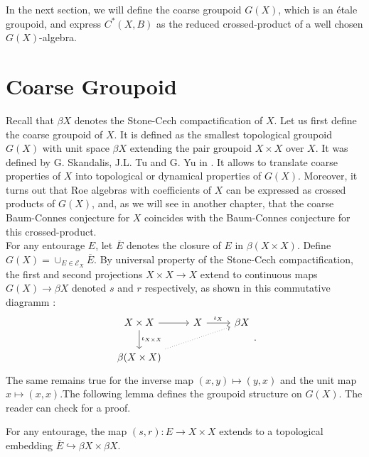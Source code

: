 In the next section, we will define the coarse groupoid $G(X)$, which is an étale groupoid, and express $C^*(X,B)$ as the reduced crossed-product of a well chosen $G(X)$-algebra.


\section{Coarse Groupoid}  %


Recall that $\beta X$ denotes the Stone-Cech compactification of $X$. Let us first define the coarse groupoid of $X$. It is defined as the smallest topological groupoid $G(X)$ with unit space $\beta X$ extending the pair groupoid $X\times X$ over $X$. It was defined by G. Skandalis, J.L. Tu and G. Yu in \cite{SkTuYU}. It allows to translate coarse properties of $X$ into topological or dynamical properties of $G(X)$. Moreover, it turns out that Roe algebras with coefficients of $X$ can be expressed as crossed products of $G(X)$, and, as we will see in another chapter, that the coarse Baum-Connes conjecture for $X$ coincides with the Baum-Connes conjecture for this crossed-product.  \\

For any entourage $E$, let $\overline E$ denotes the closure of $E$ in $\beta (X\times X)$. Define $G(X) = \cup_{E\in\mathcal E_X} \overline E$. By universal property of the Stone-Cech compactification, the first and second projections $X\times X\rightarrow X$ extend to continuous maps $G(X)\rightarrow \beta X$ denoted $s$ and $r$ respectively, as shown in this commutative diagramm :  
\[\begin{tikzcd}
X\times X \arrow{r}\arrow{d}{\iota_{X\times X}} &  X \arrow{r}{\iota_X} & \beta X \\
\beta (X\times X) \arrow[dotted]{urr} & & 
\end{tikzcd}.\]
The same remains true for the inverse map $(x,y)\mapsto (y,x)$ and the unit map $x\mapsto (x,x)$.The following lemma defines the groupoid structure on $G(X)$. The reader can check \cite{RoeCoarse} for a proof.

\begin{lem}\cite{RoeCoarse}
For any entourage, the map $(s,r) : E\rightarrow X\times X$ extends to a topological embedding $\overline E \hookrightarrow \beta X\times \beta X$.
\end{lem}

